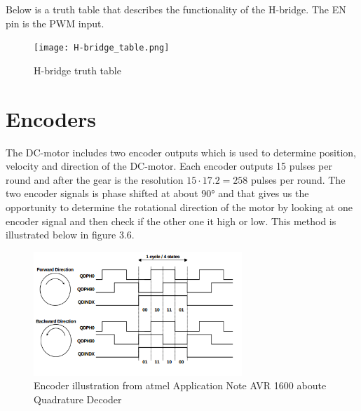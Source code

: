 Below is a truth table that describes the functionality of the H-bridge. The EN pin is the PWM input.  

  \begin{figure}[!h!]
	\centering
	\texttt{[image: H-bridge\_table.png]}
	\caption{H-bridge truth table}
	\label{fig:intro_4}
\end{figure}

\newpage
\section{Encoders}
  The DC-motor includes two encoder outputs which is used to determine position, velocity and direction of the DC-motor.
  Each encoder outputs 15 pulses per round and after the gear is the resolution $15 \cdot 17.2 = 258$ pulses per round.
  The two encoder signals is phase shifted at about $\ang{90}$ and that gives us the opportunity to determine the rotational direction of the motor by looking at one encoder signal and then check if the other one it high or low. This method is illustrated below in figure 3.6.
   
  \begin{figure}[!h!]
	\centering
	\includegraphics[width=0.7\textwidth]{resources/encoder_atmel.png}
	\caption{Encoder illustration from atmel Application Note AVR 1600 aboute Quadrature Decoder}
	\label{fig:5}
\end{figure}

